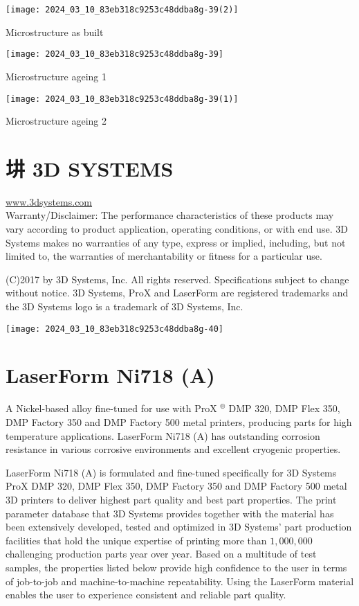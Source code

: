 \documentclass[10pt]{article}
\begin{document}
\begin{center}
\texttt{[image: 2024\_03\_10\_83eb318c9253c48ddba8g-39(2)]}
\end{center}

Microstructure as built

\begin{center}
\texttt{[image: 2024\_03\_10\_83eb318c9253c48ddba8g-39]}
\end{center}

Microstructure ageing 1

\begin{center}
\texttt{[image: 2024\_03\_10\_83eb318c9253c48ddba8g-39(1)]}
\end{center}

Microstructure ageing 2

\section*{㘫 3D SYSTEMS}
\href{http://www.3dsystems.com}{www.3dsystems.com}\\
Warranty/Disclaimer: The performance characteristics of these products may vary according to product application, operating conditions, or with end use. 3D Systems makes no warranties of any type, express or implied, including, but not limited to, the warranties of merchantability or fitness for a particular use.

(C)2017 by 3D Systems, Inc. All rights reserved. Specifications subject to change without notice. 3D Systems, ProX and LaserForm are registered trademarks and the 3D Systems logo is a trademark of 3D Systems, Inc.

\begin{center}
\texttt{[image: 2024\_03\_10\_83eb318c9253c48ddba8g-40]}
\end{center}

\section*{LaserForm Ni718 (A)}
A Nickel-based alloy fine-tuned for use with ProX ${ }^{\circledR}$ DMP 320, DMP Flex 350, DMP Factory 350 and DMP Factory 500 metal printers, producing parts for high temperature applications. LaserForm Ni718 (A) has outstanding corrosion resistance in various corrosive environments and excellent cryogenic properties.

LaserForm Ni718 (A) is formulated and fine-tuned specifically for 3D Systems ProX DMP 320, DMP Flex 350, DMP Factory 350 and DMP Factory 500 metal 3D printers to deliver highest part quality and best part properties. The print parameter database that 3D Systems provides together with the material has been extensively developed, tested and optimized in 3D Systems' part production facilities that hold the unique expertise of printing more than $1,000,000$ challenging production parts year over year. Based on a multitude of test samples, the properties listed below provide high confidence to the user in terms of job-to-job and machine-to-machine repeatability. Using the LaserForm material enables the user to experience consistent and reliable part quality.
\end{document}
